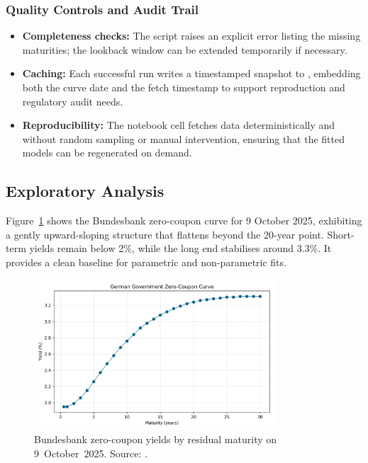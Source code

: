 \documentclass[12pt]{article}
\newcommand{\inlinecode}[1]{\texttt{\detokenize{#1}}}
\begin{document}
\begin{spacing}{1.15}
\subsubsection{Quality Controls and Audit Trail}
\begin{itemize}
    \item \textbf{Completeness checks:} The script raises an explicit error listing the missing maturities; the lookback window can be extended temporarily if necessary.
    \item \textbf{Caching:} Each successful run writes a timestamped snapshot to \inlinecode{data/raw/}, embedding both the curve date and the fetch timestamp to support reproduction and regulatory audit needs.
    \item \textbf{Reproducibility:} The notebook cell fetches data deterministically and without random sampling or manual intervention, ensuring that the fitted models can be regenerated on demand.
\end{itemize}

\end{spacing}

\subsection{Exploratory Analysis}
\begin{spacing}{1.15}
Figure~\ref{fig:raw-curve} shows the Bundesbank zero-coupon curve for 9 October 2025, exhibiting a gently upward-sloping structure that flattens beyond the 20-year point. Short-term yields remain below 2\%, while the long end stabilises around 3.3\%. It provides a clean baseline for parametric and non-parametric fits.
\end{spacing}

\begin{figure}[htbp]
  \centering
  \includegraphics[width=0.8\textwidth]{../data/output/figure_raw_curve.png}
  \caption{Bundesbank zero-coupon yields by residual maturity on 9~October~2025. Source: \parencite{bundesbank_zero_coupon}.}
  \label{fig:raw-curve}
\end{figure}
\end{document}
